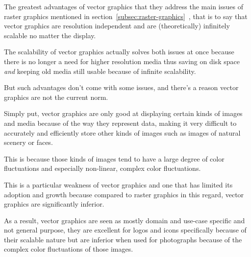 \documentclass[12pt]{article}
\newcommand{\sentence}{} %
\newcommand{\italic}[1]{\textit{#1}}
\newcommand{\fullref}[1]{\ref{#1}~\nameref{#1}}
\begin{document}
    \bigskip
    The greatest advantages of vector graphics that they address the main issues of raster graphics mentioned in
    section~\fullref{subsec:raster-graphics}, that is to say that vector graphics are resolution independent
    and are (theoretically) infinitely scalable no matter the display\cite{ferraiolo2000scalable}.
    \sentence
    The scalability of vector graphics actually solves both issues at once because there is no longer a need for
    higher resolution media thus saving on disk space \italic{and} keeping old media still usable because of infinite
    scalability.
    \sentence
    But such advantages don't come with some issues, and there's a reason vector graphics are not the current norm.
    \sentence
    Simply put, vector graphics are only good at displaying certain kinds of images and media because of the way they
    represent data, making it very difficult to accurately and efficiently store other kinds of images such as images
    of natural scenery or faces\cite{noauthor_raster_nodate}.
    \sentence
    This is because those kinds of images tend to have a large degree of color fluctuations and especially
    non-linear, complex color fluctuations.
    \sentence
    This is a particular weakness of vector graphics and one that has limited its adoption and growth because
    compared to raster graphics in this regard, vector graphics are significantly inferior.
    \sentence
    As a result, vector graphics are seen as mostly domain and use-case specific and not general purpose, they are
    excellent for logos and icons specifically because of their scalable nature but are inferior when used for
    photographs because of the complex color fluctuations of those images.
\end{document}
